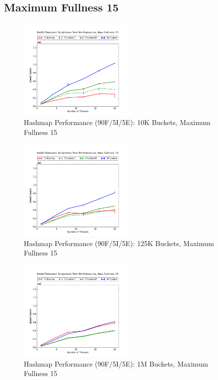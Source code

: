 \subsection{Maximum Fullness 15}

\begin{figure}[H]
    \centering
    \caption{Hashmap Performance (90F/5I/5E): 10K Buckets, Maximum Fullness 15}
    \includegraphics[width=0.5\textwidth]{maps/15HM10K:F90,I5,E5.png} 
    
\end{figure}

\begin{figure}[H]
    \centering
    \caption{Hashmap Performance (90F/5I/5E): 125K Buckets, Maximum Fullness 15}
    \includegraphics[width=0.5\textwidth]{maps/15HM125K:F90,I5,E5.png} 
    
\end{figure}

\begin{figure}[H]
    \centering
    \caption{Hashmap Performance (90F/5I/5E): 1M Buckets, Maximum Fullness 15}
    \includegraphics[width=0.5\textwidth]{maps/15HM1M:F90,I5,E5.png} 
    
\end{figure}

